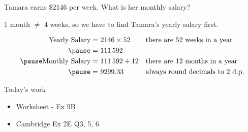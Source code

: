 \documentclass[aspectratio=1610,10pt]{beamer}
\begin{document}
\begin{frame}
  \begin{example}
    Tamara earns \$2146 per week. What is her monthly salary?
  \end{example}\pause
  \vspace{-7pt}
  \begin{important}
    1 month $\neq$ 4 weeks, so we have to find Tamara's yearly salary first.
  \end{important}\pause
  \begin{solution}
    \[\begin{aligned}
      \text{Yearly Salary}=&\ 2146\times 52 && \text{there are 52 weeks in a year}\\\pause
      =&\ 111\,592\\\pause
      \text{Monthly Salary}=&\ 111\,592\div 12 && \text{there are 12 months in a year}\\\pause
      =&\ 9299.33 && \text{always round decimals to 2 d.p.}
    \end{aligned}\]
  \end{solution}
\end{frame}

\begin{frame}{Today's work}
  \begin{itemize}
    \item Worksheet - Ex 9B
    \item Cambridge Ex 2E Q3, 5, 6
  \end{itemize}
\end{frame}
\end{document}
